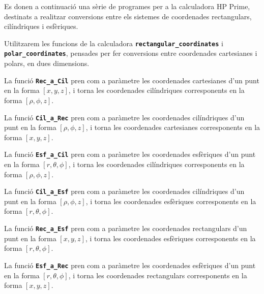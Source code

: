 \documentclass[catalan,a4paper,twoside,11pt]{article}
\begin{document}
\lstset{
	language=HPPRIME,
	basicstyle=\small\sf,
	numbers=left,
	frame=lines
}

Es donen a continuació una sèrie de programes per a la calculadora HP Prime, destinats a realitzar conversions entre els  sistemes de coordenades rectangulars, cilíndriques i esfèriques.

Utilitzarem les funcions de la calculadora \texttt{\textbf{rectangular\_coordinates}} i \texttt{\textbf{polar\_coordinates}}, pensades per fer conversions entre coordenades cartesianes i polars, en dues dimensions.

La funció \texttt{\textbf{Rec\_a\_Cil}} pren com a paràmetre les coordenades cartesianes d'un punt en la forma $[x,y,z]$, i torna les coordenades cilíndriques corresponents en la forma $[\rho,\phi,z]$.



La funció \texttt{\textbf{Cil\_a\_Rec}} pren com a paràmetre les coordenades cilíndriques d'un punt en la forma $[\rho,\phi,z]$, i torna les coordenades cartesianes corresponents en la forma  $[x,y,z]$.


La funció \texttt{\textbf{Esf\_a\_Cil}} pren com a paràmetre les coordenades esfèriques d'un punt en la forma $[r, \theta,\phi]$, i torna les coordenades cilíndriques corresponents en la forma  $[\rho,\phi,z]$.


La funció \texttt{\textbf{Cil\_a\_Esf}} pren com a paràmetre les coordenades cilíndriques  d'un punt en la forma $[\rho,\phi,z]$, i torna les coordenades esfèriques corresponents en la forma $[r,\theta,\phi]$.


La funció \texttt{\textbf{Rec\_a\_Esf}} pren com a paràmetre les coordenades rectangulars  d'un punt en la forma $[x,y,z]$, i torna les coordenades esfèriques corresponents en la forma $[r,\theta,\phi]$.


La funció \texttt{\textbf{Esf\_a\_Rec}} pren com a paràmetre les coordenades esfèriques d'un punt en la forma $[r,\theta,\phi]$, i torna les coordenades rectangulars corresponents en la forma $[x,y,z]$.

\end{document}
